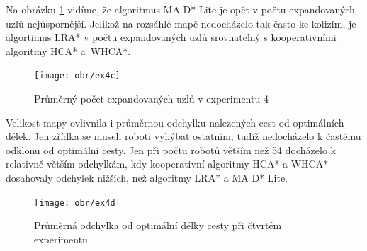 Na obrázku \ref{obr:ex4c} vidíme, že algoritmus MA D* Lite je opět v počtu expandovaných uzlů nejúspornější. Jelikož na rozsáhlé mapě nedocházelo tak často ke kolizím, je algortimus LRA* v počtu expandovaných uzlů srovnatelný s kooperativními algoritmy HCA* a~WHCA*.

\vspace*{-10mm}
\begin{figure}[H]
	\begin{center}
		\texttt{[image: obr/ex4c]}
	\end{center}
	\vspace*{-10mm}
	\caption[caption]{Průměrný počet expandovaných uzlů v experimentu 4}
	\label{obr:ex4c}
\end{figure}

Velikost mapy ovlivnila i průměrnou odchylku nalezených cest od optimálních délek. Jen zřídka se museli roboti vyhýbat ostatním, tudíž nedocházelo k častému odklonu od optimální cesty. Jen při počtu robotů větším než 54 docházelo k relativně větším odchylkám, kdy kooperativní algoritmy HCA* a WHCA* dosahovaly odchylek nižších, než algoritmy LRA* a MA D* Lite.

\vspace*{-10mm}
\begin{figure}[H]
	\begin{center}
		\texttt{[image: obr/ex4d]}
	\end{center}
	\vspace*{-10mm}
	\caption[caption]{Průměrná odchylka od optimální délky cesty při čtvrtém experimentu}
	\label{obr:ex4d}
\end{figure}

\clearpage

